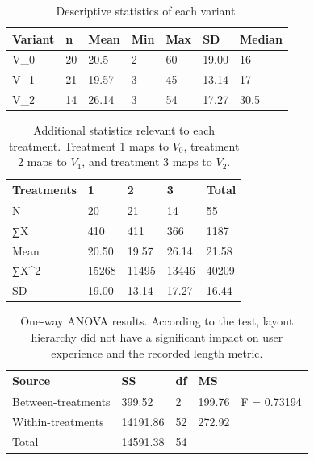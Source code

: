 \documentclass[conference]{IEEEtran}
\begin{document}
\begin{table}[h]
\centering
\caption{Descriptive statistics of each variant.}
\label{tab:desc-stats}
\begin{tabular}{lllllll} 
\toprule
  Variant   & n  & Mean  & Min & Max & SD    & Median  \\
  \midrule
V_0 & 20 & 20.5  & 2   & 60  & 19.00 & 16      \\
V_1 & 21 & 19.57 & 3   & 45  & 13.14 & 17      \\
V_2 & 14 & 26.14 & 3   & 54  & 17.27 & 30.5    \\
\bottomrule
\end{tabular}
\end{table}

\begin{table}[h]
\centering
\caption{Additional statistics relevant to each treatment. Treatment 1 maps to \(V_0\), treatment 2 maps to \(V_1\), and treatment 3 maps to \(V_2\).}
\label{tab:treatments}
\begin{tabular}{lllll} 
\toprule
Treatments      & 1     & 2     & 3              & Total  \\
\midrule
N       & 20    & 21    & 14             & 55     \\
∑X      & 410   & 411   & 366            & 1187   \\
Mean    & 20.50 & 19.57 & 26.14          & 21.58  \\
∑X\^{}2 & 15268 & 11495 & 13446          & 40209  \\
SD      & 19.00 & 13.14 & 17.27          & 16.44  \\
\bottomrule
\end{tabular}
\end{table}



\begin{table}[h]
\centering
\caption{One-way ANOVA results. According to the test, layout hierarchy did not have a significant impact on user experience and the recorded length metric.}
\label{tab:within-treatments}
\begin{tabular}{lllll} 
\toprule
Source             & SS       & df & MS     &              \\
\midrule
Between-treatments & 399.52   & 2  & 199.76 & F = 0.73194  \\
Within-treatments  & 14191.86 & 52 & 272.92 &              \\
Total              & 14591.38 & 54 &        &              \\
\bottomrule
\end{tabular}
\end{table}
\end{document}
